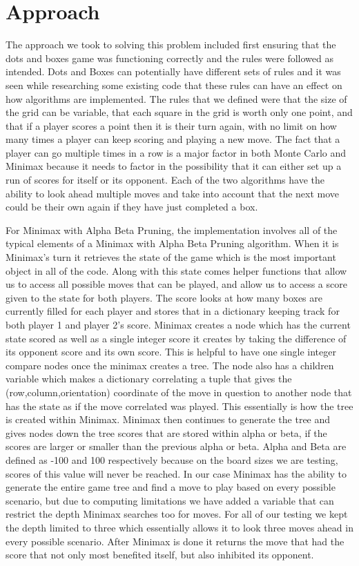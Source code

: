 \documentclass[12pt]{article}
\begin{document}
    \section{Approach}
    The approach we took to solving this problem included first ensuring that the dots and boxes game was functioning correctly and the rules were followed as intended. Dots and Boxes can potentially have different sets of rules and it was seen while researching some existing code that these rules can have an effect on how algorithms are implemented. The rules that we defined were that the size of the grid can be variable, that each square in the grid is worth only one point, and that if a player scores a point then it is their turn again, with no limit on how many times a player can keep scoring and playing a new move. The fact that a player can go multiple times in a row is a major factor in both Monte Carlo and Minimax because it needs to factor in the possibility that it can either set up a run of scores for itself or its opponent. Each of the two algorithms have the ability to look ahead multiple moves and take into account that the next move could be their own again if they have just completed a box. 

    For Minimax with Alpha Beta Pruning, the implementation involves all of the typical elements of a Minimax with Alpha Beta Pruning algorithm. When it is Minimax’s turn it retrieves the state of the game which is the most important object in all of the code. Along with this state comes helper functions that allow us to access all possible moves that can be played, and allow us to access a score given to the state for both players. The score looks at how many boxes are currently filled for each player and stores that in a dictionary keeping track for both player 1 and player 2’s score. Minimax creates a node which has the current state scored as well as a single integer score it creates by taking the difference of its opponent score and its own score. This is helpful to have one single integer compare nodes once the minimax creates a tree. The node also has a children variable which makes a dictionary correlating a tuple that gives the (row,column,orientation) coordinate of the move in question to another node that has the state as if the move correlated was played. This essentially is how the tree is created within Minimax. Minimax then continues to generate the tree and gives nodes down the tree scores that are stored within alpha or beta, if the scores are larger or smaller than the previous alpha or beta. Alpha and Beta are defined as -100 and 100 respectively because on the board sizes we are testing, scores of this value will never be reached. In our case Minimax has the ability to generate the entire game tree and find a move to play based on every possible scenario, but due to computing limitations we have added a variable that can restrict the depth Minimax searches too for moves. For all of our testing we kept the depth limited to three which essentially allows it to look three moves ahead in every possible scenario. After Minimax is done it returns the move that had the score that not only most benefited itself, but also inhibited its opponent. 
\end{document}
